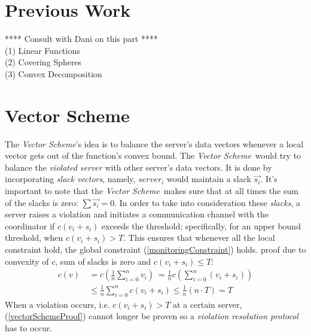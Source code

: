\documentclass[10pt, conference]{IEEEtran}
\newcommand{\vectorScheme}{\textit{Vector Scheme}}
\begin{document}
\section{Previous Work}
**** Consult with Dani on this part **** \\
(1) Linear Functions \\
(2) Covering Spheres \\
(3) Convex Decomposition

\section{Vector Scheme}
The \vectorScheme 's idea is to balance the server's data vectors whenever a local vector gets out of the function's convex bound. The \vectorScheme \ would try to balance the \textit{violated server} with other server's data vectors. It is done by incorporating \textit{slack vectors}, namely, $server_i$ would maintain a slack $\overrightarrow{s_i}$. It's important to note that the \vectorScheme \  makes sure that at all times the sum of the slacks is zero: ${\sum{\overrightarrow{s_i}} = 0}$.
In order to take into consideration these \textit{slacks}, a server raises a violation and initiates a communication channel with the coordinator if ${c(v_i+s_i)}$ exceeds the threshold; specifically, for an upper bound threshold, when ${c(v_i+s_i) > T}$. This ensures that whenever all the local constraint hold, the global constraint (\ref{monitoringConstraint}) holds. proof due to convexity of $c$, sum of slacks is zero and ${c(v_i+s_i) \leq T}$:
\begin{equation}
\label{vectorSchemeProof}
\begin{aligned}
 c(v)  \
	   &=  c\left(\frac{1}{n} \sum\limits_{i=0}^{n}{v_i}\right)  \
        =  \frac{1}{n} c\left(\sum\limits_{i=0}^{n}{(v_i + s_i)}\right) \\
      &\leq   \frac{1}{n} \sum\limits_{i=0}^{n}{c(v_i + s_i)}
       \leq   \frac{1}{n}(n \cdot T)
       = T
\end{aligned}
\end{equation}
When a violation occurs, i.e. ${c(v_i+s_i) > T}$ at a certain server, (\ref{vectorSchemeProof}) cannot longer be proven so a \textit{violation resolution protocol} has to occur.
\end{document}
